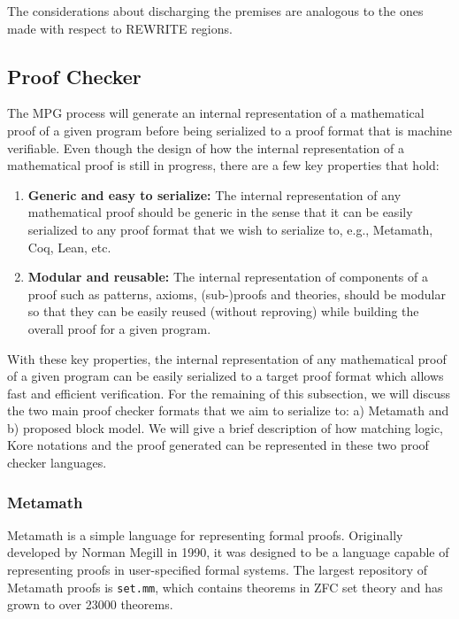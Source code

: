\documentclass{article}
\theoremstyle{plain}
\theoremstyle{definition}
\begin{document}
The considerations about discharging the premises are analogous to the ones made with respect to REWRITE regions.
\fi

\subsection{Proof Checker} \label{sec:proof_checker}

The MPG process will generate an internal representation of a mathematical proof of a given program before being serialized to a proof format that is machine verifiable. Even though the design of how the internal representation of a mathematical proof is still in progress, there are a few key properties that hold:

\begin{enumerate}
    \item \textbf{Generic and easy to serialize:} The internal representation of any mathematical proof should be generic in the sense that it can be easily serialized to any proof format that we wish to serialize to, e.g., Metamath, Coq, Lean, etc.
    \item \textbf{Modular and reusable:} The internal representation of components of a proof such as patterns, axioms, (sub-)proofs and theories, should be modular so that they can be easily reused (without reproving) while building the overall proof for a given program.
\end{enumerate}

With these key properties, the internal representation of any mathematical proof of a given program can be easily serialized to a target proof format which allows fast and efficient verification. For the remaining of this subsection, we will discuss the two main proof checker formats that we aim to serialize to: a) Metamath and b) proposed block model. We will give a brief description of how matching logic, Kore notations and the proof generated can be represented in these two proof checker languages.

\subsubsection{Metamath}
\label{sec:ml_mm}

Metamath \cite{metamath} is a simple language for representing formal proofs. Originally developed by Norman Megill in 1990, it was designed to be a language capable of representing proofs in user-specified formal systems. The largest repository of Metamath proofs is \texttt{set.mm}, which contains theorems in ZFC set theory and has grown to over 23000 theorems.
\end{document}
